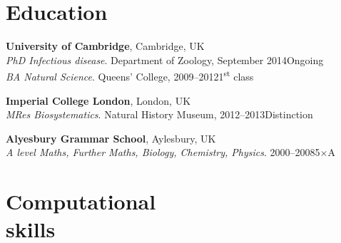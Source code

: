 \documentclass[margin]{res}
\begin{document}
\address{e: davipatti10[at]gmail.com\\t: +44 7817 188201\\\url{https://github.com/davipatti}\\dob: 19\textsuperscript{th} Sep 1989}
\address{Centre for Pathogen Evolution\\Department of Zoology\\University of Cambridge\\Cambridge, CB2 3EJ, UK}

\begin{resume}


\section{Education}
\textbf{University of Cambridge}, Cambridge, UK\\
{\sl PhD Infectious disease}. Department of Zoology, September 2014\hfill Ongoing\\
{\sl BA Natural Science}. Queens' College, 2009--2012\hfill 1\textsuperscript{st} class

\textbf{Imperial College London}, London, UK\\
{\sl MRes Biosystematics}. Natural History Museum, 2012--2013\hfill Distinction

\textbf{Alyesbury Grammar School}, Aylesbury, UK\\
{\sl A level Maths, Further Maths, Biology, Chemistry, Physics}. 2000--2008\hfill 5$\times$A

\section{Computational\\skills}


\end{resume}
\end{document}
